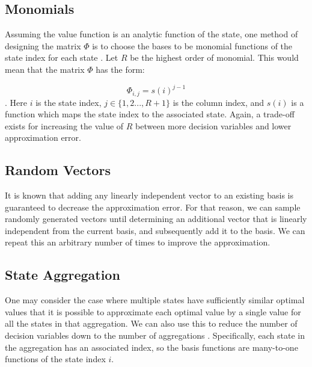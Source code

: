 \documentclass[conference]{IEEEtran}
\begin{document}
\subsection{Monomials}
    Assuming the value function is an analytic function of the state, one method of designing the matrix $\Phi$ is to choose the bases to be monomial functions of the state index for each state \cite{bertsekas1995dynamic}\cite{478953}. Let $R$ be the highest order of monomial. This would mean that the matrix $\Phi$ has the form:
	
	\begin{displaymath}
        \Phi_{i,j}=s(i)^{j-1}
    \end{displaymath}. Here $i$ is the state index, $j\in\{1,2...,R+1\}$ is the column index, and $s(i)$ is a function which maps the state index to the associated state. Again, a trade-off exists for increasing the value of $R$ between more decision variables and lower approximation error.
	

\subsection{Random Vectors}
    It is known that adding any linearly independent vector to an existing basis is guaranteed to decrease the approximation error. For that reason, we can sample randomly generated vectors until determining an additional vector that is linearly independent from the current basis, and subsequently add it to the basis. We can repeat this an arbitrary number of times to improve the approximation.


 \subsection{State Aggregation}
    
    One may consider the case where multiple states have sufficiently similar optimal values that it is possible to approximate each optimal value by a single value for all the states in that aggregation. We can also use this to reduce the number of decision variables down to the number of aggregations \cite{5717627}. Specifically, each state in the aggregation has an associated index, so the basis functions are many-to-one functions of the state index $i$.
    
\end{document}
